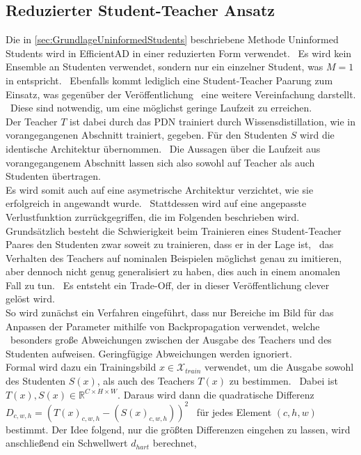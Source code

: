 \subsection{Reduzierter Student-Teacher Ansatz}
Die in \ref{sec:GrundlageUninformedStudents} beschriebene Methode \glqq Uninformed Students\grqq{} wird in EfficientAD in einer reduzierten Form verwendet. \
Es wird kein Ensemble an Studenten verwendet, sondern nur ein einzelner Student, was $M=1$ in \cite{uninformedstudents} entspricht. \
Ebenfalls kommt lediglich eine Student-Teacher Paarung zum Einsatz, was gegenüber der Veröffentlichung \cite{uninformedstudents} \ 
eine weitere Vereinfachung darstellt. \ 
Diese sind notwendig, um eine möglichst geringe Laufzeit zu erreichen. \\
Der Teacher $T$ ist dabei durch das PDN trainiert durch Wissensdistillation, wie in vorangegangenen Abschnitt trainiert, gegeben. Für den Studenten $S$ wird die identische Architektur übernommen. \
Die Aussagen über die Laufzeit aus vorangegangenem Abschnitt lassen sich also sowohl auf Teacher als auch Studenten übertragen. \\
Es wird somit auch auf eine asymetrische Architektur verzichtet, wie sie erfolgreich in \cite{ast} angewandt wurde. \
Stattdessen wird auf eine angepasste Verlustfunktion zurrückgegriffen, die im Folgenden beschrieben wird. \\
Grundsätzlich besteht die Schwierigkeit beim Trainieren eines Student-Teacher Paares den Studenten zwar soweit zu trainieren, dass er in der Lage ist, \
das Verhalten des Teachers auf nominalen Beispielen möglichst genau zu imitieren, aber dennoch nicht genug generalisiert zu haben, dies auch in einem anomalen Fall zu tun. \
Es entsteht ein Trade-Off, der in dieser Veröffentlichung clever gelöst wird. \\
So wird zunächst ein Verfahren eingeführt, dass nur Bereiche im Bild für das Anpassen der Parameter mithilfe von Backpropagation verwendet, welche \
besonders große Abweichungen zwischen der Ausgabe des Teachers und des Studenten aufweisen. Geringfügige Abweichungen werden ignoriert. \\
Formal wird dazu ein Trainingsbild $x \in \mathcal{X}_{train}$ verwendet, um die Ausgabe sowohl des Studenten $S(x)$, als auch des Teachers $T(x)$ zu bestimmen. \
Dabei ist $T(x), S(x) \in \mathbb{R}^{C \times H \times W}$. Daraus wird dann die quadratische Differenz $D_{c,w,h} = \left(T(x)_{c,w,h}-(S(x)_{c,w,h})\right)^{2}$ \  
für jedes Element $(c,h,w)$ bestimmt. Der Idee folgend, nur die größten Differenzen eingehen zu lassen, wird anschließend ein Schwellwert $d_{hart}$ berechnet, \
